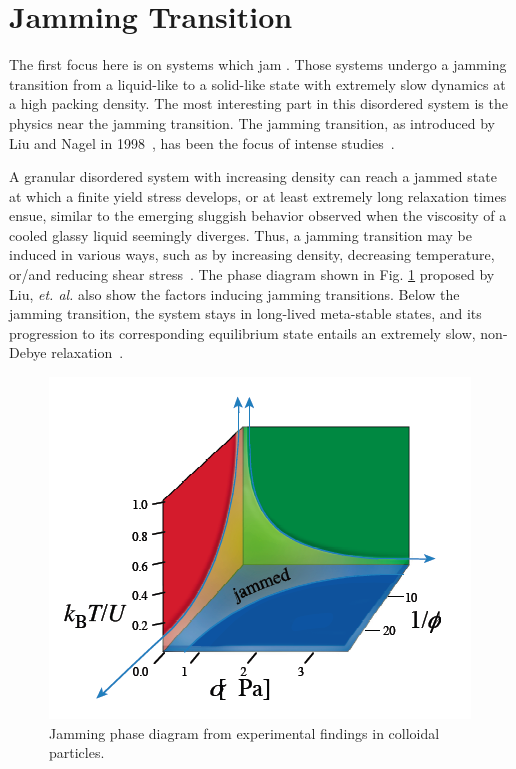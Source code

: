 \section{Jamming Transition}
\label{sec:jam_intro}
The first focus here is on systems which jam \cite{Biroli2007}. Those systems undergo 
a jamming transition from a liquid-like to a solid-like state with extremely slow 
dynamics at a high packing density. The most interesting part in this 
disordered system is the physics near the jamming transition. 
The jamming transition, as introduced by Liu and
Nagel in 1998~\cite{Liu1998}, has been the focus of
intense studies~\cite{Biroli2007,Liu2010,Berthier2011}. 

A granular disordered system with increasing density can reach a jammed state at which a finite yield stress develops, or at least extremely long relaxation times
ensue, similar to the emerging sluggish behavior observed when the
viscosity of a cooled glassy liquid seemingly diverges. Thus, a jamming
transition may be induced in various ways, such as by increasing density,
decreasing temperature, or/and reducing shear stress~\cite{Liu2010}. The phase diagram shown in Fig. \ref{fig:intro-jam-pd} proposed by Liu, {\it et. al.} \cite{liuweb, Liu1998} also show the factors inducing jamming transitions. 
Below the jamming transition, the system stays in long-lived meta-stable
states, and its progression to its corresponding equilibrium state
entails an extremely slow, non-Debye relaxation~\cite{Hill1985, Ciamarra2010, van2010}.

\begin{figure}
\centering \includegraphics[width=0.6\columnwidth]{Chapter-1/jamming_phase_diagram2.png} 
\protect\caption{\label{fig:intro-jam-pd} Jamming phase diagram from experimental findings in colloidal particles.}
\end{figure}

